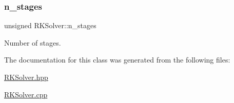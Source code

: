 \subsubsection{\texorpdfstring{n\+\_\+stages}{n\_stages}}
{\footnotesize\ttfamily unsigned R\+K\+Solver\+::n\+\_\+stages\hspace{0.3cm}{\ttfamily [protected]}}



Number of stages. 



The documentation for this class was generated from the following files\+:\begin{DoxyCompactItemize}
\item 
\hyperlink{RKSolver_8hpp}{R\+K\+Solver.\+hpp}\item 
\hyperlink{RKSolver_8cpp}{R\+K\+Solver.\+cpp}\end{DoxyCompactItemize}
